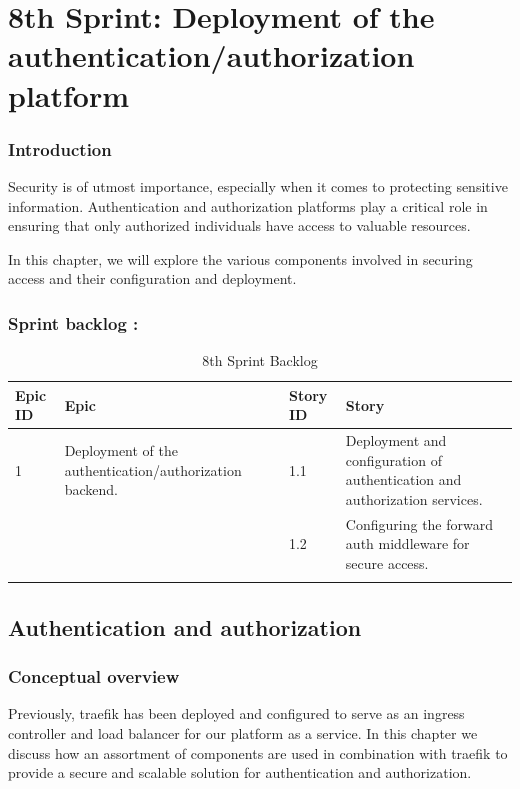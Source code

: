 \graphicspath{{./assets/}}
\setcounter{mtc}{10}
\chapter{8th Sprint: Deployment of the authentication/authorization platform }

\minitoc
\newpage
\subsection*{Introduction}
Security is of utmost importance, especially when it comes to protecting sensitive information. Authentication and authorization platforms play a critical role in ensuring that only authorized individuals have access to valuable resources. 

In this chapter, we will explore the various components involved in securing access and their configuration and deployment. 


\subsection{Sprint backlog :}

\begin{longtable}[H]{|m{1.5cm}|m{3cm}|m{1.5cm}|m{9cm}|}
\hline
{\textbf{Epic ID}} & {\textbf{Epic}} & {\textbf{Story ID}} & {\textbf{Story}}\\
\hline
1  & Deployment of the authentication/authorization backend.  &  1.1	 & Deployment and configuration of authentication and authorization services.\\
\cline{3-4}
& & 1.2 & Configuring the forward auth middleware for secure access.  \\
\cline{3-4}
\hline
\caption{8th Sprint Backlog}
\end{longtable}
\section{Authentication and authorization}
\subsection{Conceptual overview }

Previously, traefik has been deployed and configured to serve as an ingress controller and load balancer for our platform as a service. In this chapter we discuss how an assortment of components are used in combination with traefik to provide a secure and scalable solution for authentication and authorization. 

